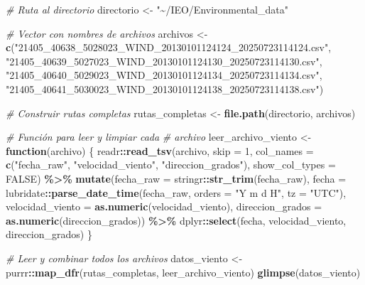 \documentclass[
]{article}
\newenvironment{Shaded}{\begin{snugshade}}{\end{snugshade}}
\newcommand{\AttributeTok}[1]{\textcolor[rgb]{0.13,0.29,0.53}{#1}}
\newcommand{\CommentTok}[1]{\textcolor[rgb]{0.56,0.35,0.01}{\textit{#1}}}
\newcommand{\ConstantTok}[1]{\textcolor[rgb]{0.56,0.35,0.01}{#1}}
\newcommand{\ControlFlowTok}[1]{\textcolor[rgb]{0.13,0.29,0.53}{\textbf{#1}}}
\newcommand{\DecValTok}[1]{\textcolor[rgb]{0.00,0.00,0.81}{#1}}
\newcommand{\FunctionTok}[1]{\textcolor[rgb]{0.13,0.29,0.53}{\textbf{#1}}}
\newcommand{\NormalTok}[1]{#1}
\newcommand{\OtherTok}[1]{\textcolor[rgb]{0.56,0.35,0.01}{#1}}
\newcommand{\SpecialCharTok}[1]{\textcolor[rgb]{0.81,0.36,0.00}{\textbf{#1}}}
\newcommand{\StringTok}[1]{\textcolor[rgb]{0.31,0.60,0.02}{#1}}
\begin{document}
\begin{Shaded}
\begin{Highlighting}[]
\CommentTok{\# Ruta al directorio}
\NormalTok{directorio }\OtherTok{\textless{}{-}} \StringTok{"\textasciitilde{}/IEO/Environmental\_data"}

\CommentTok{\# Vector con nombres de archivos}
\NormalTok{archivos }\OtherTok{\textless{}{-}} \FunctionTok{c}\NormalTok{(}\StringTok{"21405\_40638\_5028023\_WIND\_20130101124124\_20250723114124.csv"}\NormalTok{,}
    \StringTok{"21405\_40639\_5027023\_WIND\_20130101124130\_20250723114130.csv"}\NormalTok{,}
    \StringTok{"21405\_40640\_5029023\_WIND\_20130101124134\_20250723114134.csv"}\NormalTok{,}
    \StringTok{"21405\_40641\_5030023\_WIND\_20130101124138\_20250723114138.csv"}\NormalTok{)}

\CommentTok{\# Construir rutas completas}
\NormalTok{rutas\_completas }\OtherTok{\textless{}{-}} \FunctionTok{file.path}\NormalTok{(directorio,}
\NormalTok{    archivos)}

\CommentTok{\# Función para leer y limpiar cada}
\CommentTok{\# archivo}
\NormalTok{leer\_archivo\_viento }\OtherTok{\textless{}{-}} \ControlFlowTok{function}\NormalTok{(archivo) \{}
\NormalTok{    readr}\SpecialCharTok{::}\FunctionTok{read\_tsv}\NormalTok{(archivo, }\AttributeTok{skip =} \DecValTok{1}\NormalTok{, }\AttributeTok{col\_names =} \FunctionTok{c}\NormalTok{(}\StringTok{"fecha\_raw"}\NormalTok{,}
        \StringTok{"velocidad\_viento"}\NormalTok{, }\StringTok{"direccion\_grados"}\NormalTok{),}
        \AttributeTok{show\_col\_types =} \ConstantTok{FALSE}\NormalTok{) }\SpecialCharTok{\%\textgreater{}\%}
        \FunctionTok{mutate}\NormalTok{(}\AttributeTok{fecha\_raw =}\NormalTok{ stringr}\SpecialCharTok{::}\FunctionTok{str\_trim}\NormalTok{(fecha\_raw),}
            \AttributeTok{fecha =}\NormalTok{ lubridate}\SpecialCharTok{::}\FunctionTok{parse\_date\_time}\NormalTok{(fecha\_raw,}
                \AttributeTok{orders =} \StringTok{"Y m d H"}\NormalTok{, }\AttributeTok{tz =} \StringTok{"UTC"}\NormalTok{),}
            \AttributeTok{velocidad\_viento =} \FunctionTok{as.numeric}\NormalTok{(velocidad\_viento),}
            \AttributeTok{direccion\_grados =} \FunctionTok{as.numeric}\NormalTok{(direccion\_grados)) }\SpecialCharTok{\%\textgreater{}\%}
\NormalTok{        dplyr}\SpecialCharTok{::}\FunctionTok{select}\NormalTok{(fecha, velocidad\_viento,}
\NormalTok{            direccion\_grados)}
\NormalTok{\}}

\CommentTok{\# Leer y combinar todos los archivos}
\NormalTok{datos\_viento }\OtherTok{\textless{}{-}}\NormalTok{ purrr}\SpecialCharTok{::}\FunctionTok{map\_dfr}\NormalTok{(rutas\_completas,}
\NormalTok{    leer\_archivo\_viento)}
\FunctionTok{glimpse}\NormalTok{(datos\_viento)}
\end{Highlighting}
\end{Shaded}
\end{document}
